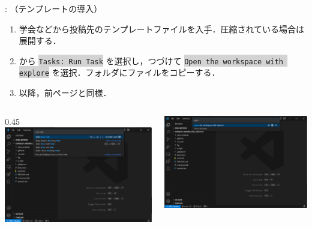 \documentclass[aspectratio=169,dvipdfmx,cjk]{beamer}
\newcommand{\cmdline}[1]{
    \colorbox{lightgray}{\lstinline[style=command]{#1}}
}
\begin{document}
\begin{frame}{\insertsection \thesubsection: \insertsubsection （テンプレートの導入）}
  \begin{enumerate}
    \item 学会などから投稿先のテンプレートファイルを入手．圧縮されている場合は展開する．
    \item {} から \cmdline{Tasks: Run Task} を選択し，つづけて\cmdline{Open the workspace with explore} を選択．フォルダにファイルをコピーする．
    \item 以降，前ページと同様．
  \end{enumerate}
  \begin{columns}
    \begin{column}{0.45\textwidth}
        \includegraphics[width=1.0\linewidth]{fig/run-task.png}
    \end{column}
    \begin{column}{0.45\textwidth}
      \includegraphics[width=1.0\linewidth]{fig/open-workspace.png}
    \end{column}
  \end{columns}
\end{frame}
\end{document}
